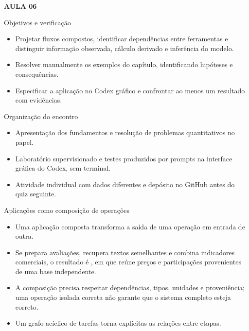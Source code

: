 \documentclass[10pt,aspectratio=169]{beamer}
\begin{document}
\begin{frame}[t]{}
\vspace{14mm}\textcolor{InsperRed}{\bfseries AULA 06}\par\vspace{4mm}{\LARGE\bfseries Composição de aplicações com LLMs}\par\vspace{6mm}{\large Marketing Analítico}\par{}
\end{frame}

\begin{frame}[t]{Objetivos e verificação}
\small
\begin{itemize}
\item Projetar fluxos compostos, identificar dependências entre ferramentas e distinguir informação observada, cálculo derivado e inferência do modelo.
\item Resolver manualmente os exemplos do capítulo, identificando hipóteses e consequências.
\item Especificar a aplicação no Codex gráfico e confrontar ao menos um resultado com evidências.
\end{itemize}
\end{frame}

\begin{frame}[t]{Organização do encontro}
\small
\begin{itemize}
\item Apresentação dos fundamentos e resolução de problemas quantitativos no papel.
\item Laboratório supervisionado e testes produzidos por prompts na interface gráfica do Codex, sem terminal.
\item Atividade individual com dados diferentes e depósito no GitHub antes do quiz seguinte.
\end{itemize}
\end{frame}

\begin{frame}[t]{Aplicações como composição de operações}
\small
\begin{itemize}
\item Uma aplicação composta transforma a saída de uma operação em entrada de outra.
\item Se prepara avaliações, recupera textos semelhantes e combina indicadores comerciais, o resultado é , em que reúne preços e participações provenientes de uma base independente.
\item A composição precisa respeitar dependências, tipos, unidades e proveniência; uma operação isolada correta não garante que o sistema completo esteja correto.
\item Um grafo acíclico de tarefas torna explícitas as relações entre etapas.
\end{itemize}
\end{frame}
\end{document}
